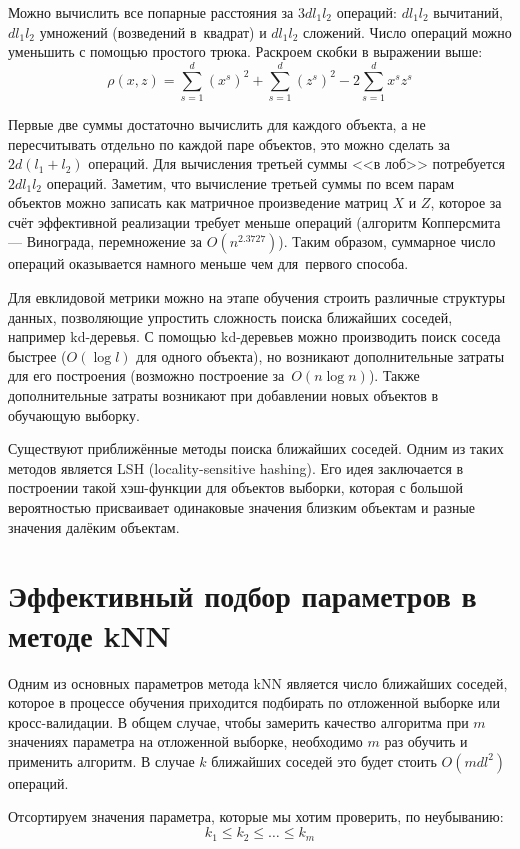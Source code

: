 \documentclass[12pt,fleqn]{article}
\begin{document}
Можно вычислить все попарные расстояния за $3dl_1 l_2$ операций: $dl_1 l_2$ вычитаний, $dl_1 l_2$ умножений (возведений в~квадрат) и $d l_1 l_2$ сложений. Число операций можно уменьшить с помощью простого трюка. Раскроем скобки в выражении выше:
\[
\rho(x, z) = \sum_{s=1}^{d}({x^s})^2 + \sum_{s=1}^{d}(z^s)^2 - 2 \sum_{s=1}^{d}x^sz^s
\]


Первые две суммы достаточно вычислить для каждого объекта, а не пересчитывать отдельно по каждой паре объектов, это можно сделать за $2d(l_1 + l_2)$ операций. Для вычисления третьей суммы <<в лоб>> потребуется $2dl_1l_2$ операций. Заметим, что вычисление третьей суммы по всем парам объектов можно записать как матричное произведение матриц $X$ и $Z$, которое за счёт эффективной реализации требует меньше операций (алгоритм Копперсмита --- Винограда, перемножение за $O(n^{2.3727})$).
Таким образом, суммарное число операций оказывается намного меньше чем для~первого способа. 

Для евклидовой метрики можно на этапе обучения строить различные структуры данных, позволяющие упростить сложность поиска ближайших соседей, например kd-деревья. С помощью kd-деревьев можно производить поиск соседа быстрее ($O(\log l)$ для одного объекта), но возникают дополнительные затраты для его построения (возможно построение за~$O(n \log n)$). Также дополнительные затраты возникают при добавлении новых объектов в обучающую выборку.

Существуют приближённые методы поиска ближайших соседей. Одним из таких методов является LSH (locality-sensitive hashing). Его идея заключается в построении такой хэш-функции для объектов выборки, которая с большой вероятностью присваивает одинаковые значения близким объектам и разные значения далёким объектам.

\section*{Эффективный подбор параметров в методе kNN}

Одним из основных параметров метода kNN является число ближайших соседей, которое в процессе обучения приходится подбирать по отложенной выборке или кросс-валидации. В общем случае, чтобы замерить качество алгоритма при $m$ значениях параметра на отложенной выборке, необходимо $m$ раз обучить и применить алгоритм. В случае $k$ ближайших соседей это будет стоить $O(mdl^2)$ операций.

Отсортируем значения параметра, которые мы хотим проверить, по неубыванию:
\[k_1 \leqslant k_2 \leqslant \ldots \leqslant k_m\]
\end{document}

